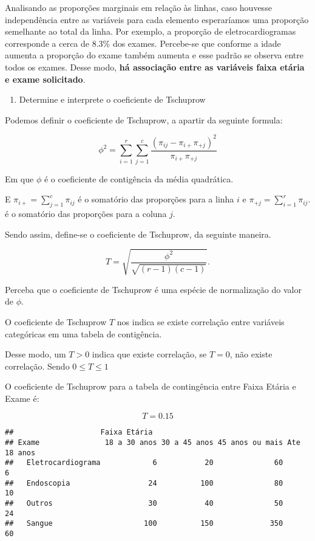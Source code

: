 \documentclass[
]{article}
\providecommand{\tightlist}{%
  \setlength{\itemsep}{0pt}\setlength{\parskip}{0pt}}
\begin{document}
Analisando as proporções marginais em relação às linhas, caso houvesse
independência entre as variáveis para cada elemento esperaríamos uma
proporção semelhante ao total da linha. Por exemplo, a proporção de
eletrocardiogramas corresponde a cerca de 8.3\% dos exames. Percebe-se
que conforme a idade aumenta a proporção do exame também aumenta e esse
padrão se observa entre todos os exames. Desse modo, \textbf{há
associação entre as variáveis faixa etária e exame solicitado}.

\begin{enumerate}
\def\labelenumi{\alph{enumi})}
\setcounter{enumi}{1}
\tightlist
\item
  Determine e interprete o coeficiente de Tschuprow
\end{enumerate}

Podemos definir o coeficiente de Tschuprow, a apartir da seguinte
formula:

\[
{\displaystyle \phi ^{2}=\sum _{i=1}^{r}\sum _{j=1}^{c}{\frac {(\pi _{ij}-\pi _{i+}\pi _{+j})^{2}}{\pi _{i+}\pi _{+j}}}}
\]

Em que \(\phi\) é o coeficiente de contigência da média quadrática.

E \({\displaystyle \pi _{i+}=\sum _{j=1}^{c}\pi _{ij}}\) é o somatório
das proporções para a linha \(i\) e
\({\displaystyle \pi _{+j}=\sum _{i=1}^{r}\pi _{ij}.}\) é o somatório
das proporções para a coluna \(j\).

Sendo assim, define-se o coeficiente de Tschuprow, da seguinte maneira.

\[
{\displaystyle T={\sqrt {\frac {\phi ^{2}}{\sqrt {(r-1)(c-1)}}}}.}
\]

Perceba que o coeficiente de Tschuprow é uma espécie de normalização do
valor de \(\phi\).

O coeficiente de Tschuprow \(T\) nos indica se existe correlação entre
variáveis categóricas em uma tabela de contigência.

Desse modo, um \(T>0\) indica que existe correlação, se \(T = 0\), não
existe correlação. Sendo \(0 \leq T \leq1\)

O coeficiente de Tschuprow para a tabela de contingência entre Faixa
Etária e Exame é:

\[
T = 0.15
\]

\begin{verbatim}
##                    Faixa Etária
## Exame               18 a 30 anos 30 a 45 anos 45 anos ou mais Ate 18 anos
##   Eletrocardiograma            6           20              60           6
##   Endoscopia                  24          100              80          10
##   Outros                      30           40              50          24
##   Sangue                     100          150             350          60
\end{verbatim}
\end{document}
